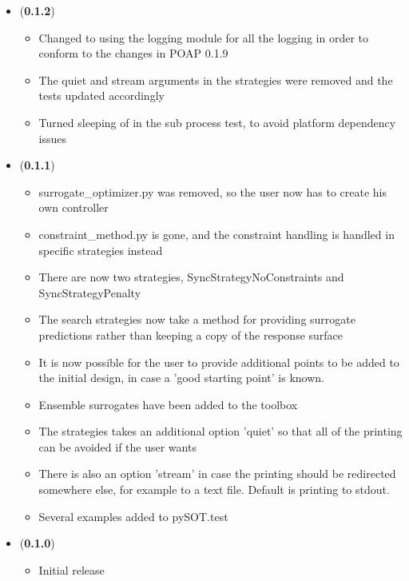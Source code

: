 \documentclass[]{article}
\begin{document}
\begin{itemize}
\item (\textbf{0.1.2})
\begin{itemize}
\item 	Changed to using the logging module for all the logging in order to conform to the changes in POAP 0.1.9
\item The quiet and stream arguments in the strategies were removed and the tests updated accordingly
\item Turned sleeping of in the sub process test, to avoid platform dependency issues
\end{itemize}

\item (\textbf{0.1.1})
\begin{itemize}
\item surrogate\_optimizer.py was removed, so the user now has to create his own controller
\item constraint\_method.py is gone, and the constraint handling is handled in specific strategies instead
\item 	There are now two strategies, SyncStrategyNoConstraints and SyncStrategyPenalty
\item The search strategies now take a method for providing surrogate predictions rather than keeping a copy of the response surface
\item It is now possible for the user to provide additional points to be added to the initial design, in case a 'good starting point' is known.
\item Ensemble surrogates have been added to the toolbox
\item 	The strategies takes an additional option 'quiet' so that all of the printing can be avoided if the user wants
\item There is also an option 'stream' in case the printing should be redirected somewhere else, for example to a text file. Default is printing to stdout.
\item 	Several examples added to pySOT.test
\end{itemize}
\item (\textbf{0.1.0})
\begin{itemize}
\item 	Initial release
\end{itemize}
\end{itemize}
\end{document}
